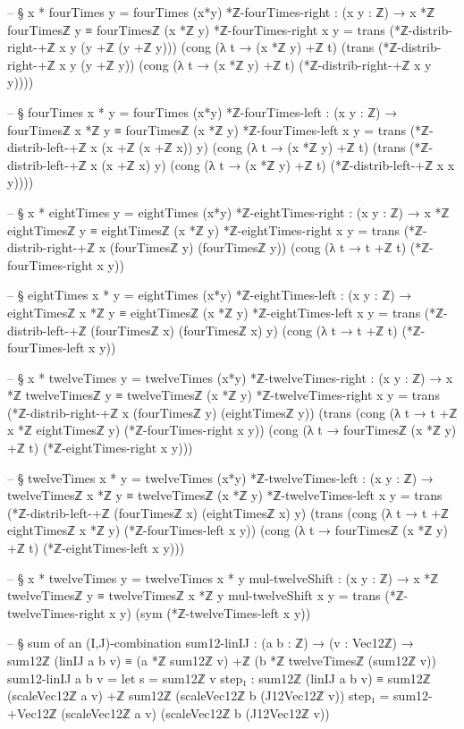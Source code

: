 \documentclass[11pt,a4paper]{book}
\begin{document}
\begin{code}
-- § x * fourTimes y = fourTimes (x*y)
*ℤ-fourTimes-right : (x y : ℤ) → x *ℤ fourTimesℤ y ≡ fourTimesℤ (x *ℤ y)
*ℤ-fourTimes-right x y =
  trans
    (*ℤ-distrib-right-+ℤ x y (y +ℤ (y +ℤ y)))
    (cong (λ t → (x *ℤ y) +ℤ t)
      (trans
        (*ℤ-distrib-right-+ℤ x y (y +ℤ y))
        (cong (λ t → (x *ℤ y) +ℤ t)
          (*ℤ-distrib-right-+ℤ x y y))))

-- § fourTimes x * y = fourTimes (x*y)
*ℤ-fourTimes-left : (x y : ℤ) → fourTimesℤ x *ℤ y ≡ fourTimesℤ (x *ℤ y)
*ℤ-fourTimes-left x y =
  trans
    (*ℤ-distrib-left-+ℤ x (x +ℤ (x +ℤ x)) y)
    (cong (λ t → (x *ℤ y) +ℤ t)
      (trans
        (*ℤ-distrib-left-+ℤ x (x +ℤ x) y)
        (cong (λ t → (x *ℤ y) +ℤ t)
          (*ℤ-distrib-left-+ℤ x x y))))

-- § x * eightTimes y = eightTimes (x*y)
*ℤ-eightTimes-right : (x y : ℤ) → x *ℤ eightTimesℤ y ≡ eightTimesℤ (x *ℤ y)
*ℤ-eightTimes-right x y =
  trans
    (*ℤ-distrib-right-+ℤ x (fourTimesℤ y) (fourTimesℤ y))
    (cong (λ t → t +ℤ t) (*ℤ-fourTimes-right x y))

-- § eightTimes x * y = eightTimes (x*y)
*ℤ-eightTimes-left : (x y : ℤ) → eightTimesℤ x *ℤ y ≡ eightTimesℤ (x *ℤ y)
*ℤ-eightTimes-left x y =
  trans
    (*ℤ-distrib-left-+ℤ (fourTimesℤ x) (fourTimesℤ x) y)
    (cong (λ t → t +ℤ t) (*ℤ-fourTimes-left x y))

-- § x * twelveTimes y = twelveTimes (x*y)
*ℤ-twelveTimes-right : (x y : ℤ) → x *ℤ twelveTimesℤ y ≡ twelveTimesℤ (x *ℤ y)
*ℤ-twelveTimes-right x y =
  trans
    (*ℤ-distrib-right-+ℤ x (fourTimesℤ y) (eightTimesℤ y))
    (trans
      (cong (λ t → t +ℤ x *ℤ eightTimesℤ y) (*ℤ-fourTimes-right x y))
      (cong (λ t → fourTimesℤ (x *ℤ y) +ℤ t) (*ℤ-eightTimes-right x y)))

-- § twelveTimes x * y = twelveTimes (x*y)
*ℤ-twelveTimes-left : (x y : ℤ) → twelveTimesℤ x *ℤ y ≡ twelveTimesℤ (x *ℤ y)
*ℤ-twelveTimes-left x y =
  trans
    (*ℤ-distrib-left-+ℤ (fourTimesℤ x) (eightTimesℤ x) y)
    (trans
      (cong (λ t → t +ℤ eightTimesℤ x *ℤ y) (*ℤ-fourTimes-left x y))
      (cong (λ t → fourTimesℤ (x *ℤ y) +ℤ t) (*ℤ-eightTimes-left x y)))

-- § x * twelveTimes y = twelveTimes x * y
mul-twelveShift : (x y : ℤ) → x *ℤ twelveTimesℤ y ≡ twelveTimesℤ x *ℤ y
mul-twelveShift x y = trans (*ℤ-twelveTimes-right x y) (sym (*ℤ-twelveTimes-left x y))

-- § sum of an (I,J)-combination
sum12-linIJ : (a b : ℤ) → (v : Vec12ℤ) →
  sum12ℤ (linIJ a b v) ≡ (a *ℤ sum12ℤ v) +ℤ (b *ℤ twelveTimesℤ (sum12ℤ v))
sum12-linIJ a b v =
  let
    s = sum12ℤ v
    step₁ : sum12ℤ (linIJ a b v)
              ≡ sum12ℤ (scaleVec12ℤ a v) +ℤ sum12ℤ (scaleVec12ℤ b (J12Vec12ℤ v))
    step₁ = sum12-+Vec12ℤ (scaleVec12ℤ a v) (scaleVec12ℤ b (J12Vec12ℤ v))


\end{code}
\end{document}
